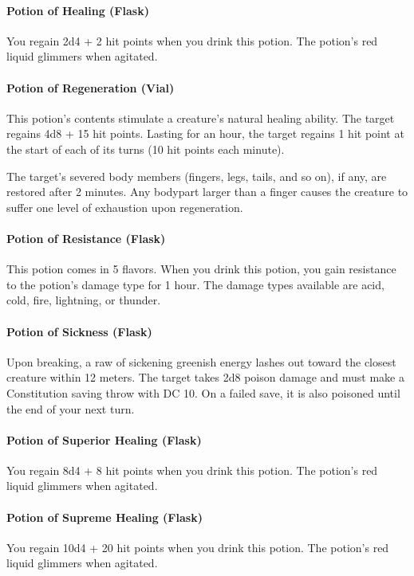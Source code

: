     \paragraph{Potion of Healing (Flask)}
        You regain 2d4 + 2 hit points when you drink this potion.
        The potion's red liquid glimmers when agitated.
    \paragraph{Potion of Regeneration (Vial)} %
        This potion's contents stimulate a creature's natural healing ability.
        The target regains 4d8 + 15 hit points.
        Lasting for an hour, the target regains 1 hit point at the start of each of its turns (10 hit points each minute).

        The target's severed body members (fingers, legs, tails, and so on), if any, are restored after 2 minutes.
        Any bodypart larger than a finger causes the creature to suffer one level of exhaustion upon regeneration.
    \paragraph{Potion of Resistance (Flask)}
        This potion comes in 5 flavors.
        When you drink this potion, you gain resistance to the potion's damage type for 1 hour.
        The damage types available are acid, cold, fire, lightning, or thunder.
    \paragraph{Potion of Sickness (Flask)} %
        Upon breaking, a raw of sickening greenish energy lashes out toward the closest creature within 12 meters.
        The target takes 2d8 poison damage and must make a Constitution saving throw with DC 10.
        On a failed save, it is also poisoned until the end of your next turn.
    \paragraph{Potion of Superior Healing (Flask)}
        You regain 8d4 + 8 hit points when you drink this potion. The potion's red liquid glimmers when agitated.
    \paragraph{Potion of Supreme Healing (Flask)}
        You regain 10d4 + 20 hit points when you drink this potion.
        The potion's red liquid glimmers when agitated.
